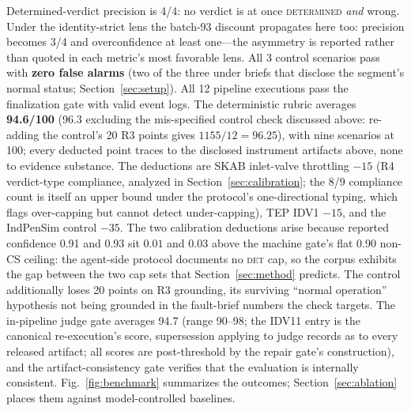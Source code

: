 \documentclass[preprint,12pt]{elsarticle}
\begin{document}
Determined-verdict precision is 4/4: no verdict is at once \mbox{\textsc{determined}} \emph{and} wrong. Under the identity-strict lens the batch-93 discount propagates here too: precision becomes 3/4 and overconfidence at least one---the asymmetry is reported rather than quoted in each metric's most favorable lens. All 3 control scenarios pass with \textbf{zero false alarms} (two of the three under briefs that disclose the segment's normal status; Section~\ref{sec:setup}). All 12 pipeline executions pass the finalization gate with valid event logs. The deterministic rubric averages \textbf{94.6/100} (96.3 excluding the mis-specified control check discussed above: re-adding the control's 20 R3 points gives $1155/12 = 96.25$), with nine scenarios at 100; every deducted point traces to the disclosed instrument artifacts above, none to evidence substance. The deductions are SKAB inlet-valve throttling $-15$ (R4 verdict-type compliance, analyzed in Section~\ref{sec:calibration}; the 8/9 compliance count is itself an upper bound under the protocol's one-directional typing, which flags over-capping but cannot detect under-capping), TEP IDV1 $-15$, and the IndPenSim control $-35$. The two calibration deductions arise because reported confidence 0.91 and 0.93 sit $0.01$ and $0.03$ above the machine gate's flat 0.90 non-CS ceiling: the agent-side protocol documents no \mbox{\textsc{det}} cap, so the corpus exhibits the gap between the two cap sets that Section~\ref{sec:method} predicts. The control additionally loses 20 points on R3 grounding, its surviving ``normal operation'' hypothesis not being grounded in the fault-brief numbers the check targets. The in-pipeline judge gate averages 94.7 (range 90--98; the IDV11 entry is the canonical re-execution's score, supersession applying to judge records as to every released artifact; all scores are post-threshold by the repair gate's construction), and the artifact-consistency gate verifies that the evaluation is internally consistent. Fig.~\ref{fig:benchmark} summarizes the outcomes; Section~\ref{sec:ablation} places them against model-controlled baselines.
\end{document}
